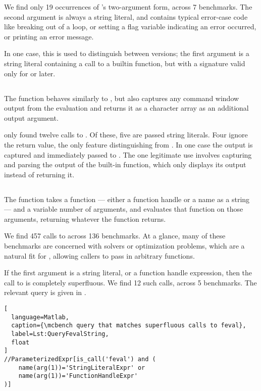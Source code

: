 We find only 19 occurrences of 's two-argument form, across 7
benchmarks. The second argument is always a string literal, and contains
typical error-case code like breaking out of a loop, or setting a flag variable
indicating an error occurred, or printing an error message.

In one case, this is used to distinguish between \matlab versions; the first
argument is a string literal containing a call to a builtin function, but with
a signature valid only for  or later.

\subsection{}

The  function behaves similarly to , but also captures
any command window output from the evaluation and returns it as a character
array as an additional output argument.

\mcbench only found twelve calls to . Of these, five are passed
string literals. Four ignore the return value, the only feature distinguishing
 from . In one case the output is captured and
immediately passed to . The one legitimate use involves capturing
and parsing the output of the \matlab built-in  function, which
only displays its output instead of returning it.

\subsection{}

The  function takes a function --- either a function handle or a
name as a string --- and a variable number of arguments, and evaluates that
function on those arguments, returning whatever the function returns.

We find 457 calls to  across 136 benchmarks. At a glance, many of
these benchmarks are concerned with solvers or optimization problems, which are
a natural fit for , allowing callers to pass in arbitrary
functions.

If the first argument is a string literal, or a function handle expression,
then the call to  is completely superfluous. We find 12 such calls,
across 5 benchmarks. The relevant query is given in
.

\begin{lstlisting}[
  language=Matlab,
  caption={\mcbench query that matches superfluous calls to feval},
  label=Lst:QueryFevalString,
  float
]
//ParameterizedExpr[is_call('feval') and (
    name(arg(1))='StringLiteralExpr' or
    name(arg(1))='FunctionHandleExpr'
)]
\end{lstlisting}

